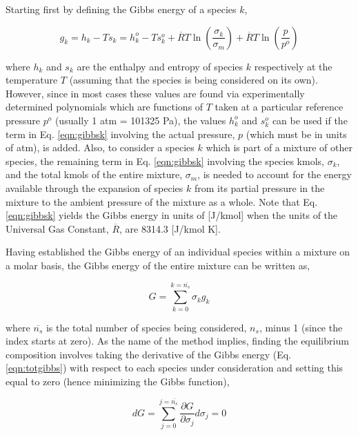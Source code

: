 	Starting first by defining the Gibbs energy of a species $k$,

\begin{equation}
	g_k = h_k - Ts_k = h^o_k - Ts^o_k + \overline{R}T \ln(\frac{\sigma_k}{\sigma_m}) + \overline{R}T 
	\ln(\frac{p}{p^o})
\label{eqn:gibbsk}
\end{equation}

	where $h_k$ and $s_k$ are the enthalpy and entropy of species $k$ respectively at the temperature
$T$ (assuming that the species is being considered on its own).  However, since in most cases these 
values are found via experimentally determined polynomials which are functions of $T$ taken at a 
particular reference pressure $p^o$ (usually 1 atm = 101325 Pa), the values $h^o_k$ and $s^o_k$ 
can be used if the term in Eq. \ref{eqn:gibbsk} involving the actual pressure, $p$ (which must be 
in units of atm), is added.  Also, to consider a species $k$ which is part of a mixture of other species, 
the remaining term in Eq. \ref{eqn:gibbsk} involving the species kmols, $\sigma_k$, and the total 
kmols of the entire mixture, $\sigma_m$, is needed to account for the energy 
available through the expansion of species $k$ from its partial pressure in the mixture to the
ambient pressure of the mixture as a whole.  Note that Eq. \ref{eqn:gibbsk} yields the Gibbs energy
in units of [J/kmol] when the units of the Universal Gas Constant, $\overline{R}$, are 8314.3 [J/kmol K].

	Having established the Gibbs energy of an individual species within a mixture on a molar
basis, the Gibbs energy of the entire mixture can be written as,

\begin{equation}
	G = \sum_{k=0}^{k=\overline{n_s}} \sigma_k g_k
\label{eqn:totgibbs}
\end{equation}

	where $\overline{n_s}$ is the total number of species being considered, $n_s$, minus 1 
(since the index starts at zero).  As the name of the method implies, finding the equilibrium composition 
involves taking the derivative of the Gibbs energy (Eq. \ref{eqn:totgibbs}) with respect to each species 
under consideration and setting this equal to zero (hence minimizing the Gibbs function),

\begin{displaymath}
	dG=\sum_{j=0}^{j=\overline{n_s}} \frac{\partial G}{\partial \sigma_j} d\sigma_j = 0
\end{displaymath}

